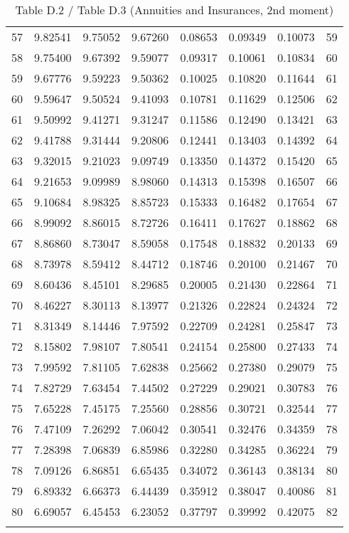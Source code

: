 \documentclass[12pt]{article}
\begin{document}
\begin{longtable}{rrrrrrrr}
  57 & 9.82541 & 9.75052 & 9.67260 & 0.08653 & 0.09349 & 0.10073 & 59 \\ 
  58 & 9.75400 & 9.67392 & 9.59077 & 0.09317 & 0.10061 & 0.10834 & 60 \\ 
  59 & 9.67776 & 9.59223 & 9.50362 & 0.10025 & 0.10820 & 0.11644 & 61 \\ 
  60 & 9.59647 & 9.50524 & 9.41093 & 0.10781 & 0.11629 & 0.12506 & 62 \\ 
  61 & 9.50992 & 9.41271 & 9.31247 & 0.11586 & 0.12490 & 0.13421 & 63 \\ 
  62 & 9.41788 & 9.31444 & 9.20806 & 0.12441 & 0.13403 & 0.14392 & 64 \\ 
  63 & 9.32015 & 9.21023 & 9.09749 & 0.13350 & 0.14372 & 0.15420 & 65 \\ 
  64 & 9.21653 & 9.09989 & 8.98060 & 0.14313 & 0.15398 & 0.16507 & 66 \\ 
  65 & 9.10684 & 8.98325 & 8.85723 & 0.15333 & 0.16482 & 0.17654 & 67 \\ 
  66 & 8.99092 & 8.86015 & 8.72726 & 0.16411 & 0.17627 & 0.18862 & 68 \\ 
  67 & 8.86860 & 8.73047 & 8.59058 & 0.17548 & 0.18832 & 0.20133 & 69 \\ 
  68 & 8.73978 & 8.59412 & 8.44712 & 0.18746 & 0.20100 & 0.21467 & 70 \\ 
  69 & 8.60436 & 8.45101 & 8.29685 & 0.20005 & 0.21430 & 0.22864 & 71 \\ 
  70 & 8.46227 & 8.30113 & 8.13977 & 0.21326 & 0.22824 & 0.24324 & 72 \\ 
  71 & 8.31349 & 8.14446 & 7.97592 & 0.22709 & 0.24281 & 0.25847 & 73 \\ 
  72 & 8.15802 & 7.98107 & 7.80541 & 0.24154 & 0.25800 & 0.27433 & 74 \\ 
  73 & 7.99592 & 7.81105 & 7.62838 & 0.25662 & 0.27380 & 0.29079 & 75 \\ 
  74 & 7.82729 & 7.63454 & 7.44502 & 0.27229 & 0.29021 & 0.30783 & 76 \\ 
  75 & 7.65228 & 7.45175 & 7.25560 & 0.28856 & 0.30721 & 0.32544 & 77 \\ 
  76 & 7.47109 & 7.26292 & 7.06042 & 0.30541 & 0.32476 & 0.34359 & 78 \\ 
  77 & 7.28398 & 7.06839 & 6.85986 & 0.32280 & 0.34285 & 0.36224 & 79 \\ 
  78 & 7.09126 & 6.86851 & 6.65435 & 0.34072 & 0.36143 & 0.38134 & 80 \\ 
  79 & 6.89332 & 6.66373 & 6.44439 & 0.35912 & 0.38047 & 0.40086 & 81 \\ 
  80 & 6.69057 & 6.45453 & 6.23052 & 0.37797 & 0.39992 & 0.42075 & 82 \\ 
  \hline
\caption{Table D.2 / Table D.3 (Annuities and Insurances, 2nd moment)} 
\end{longtable}
\end{document}
